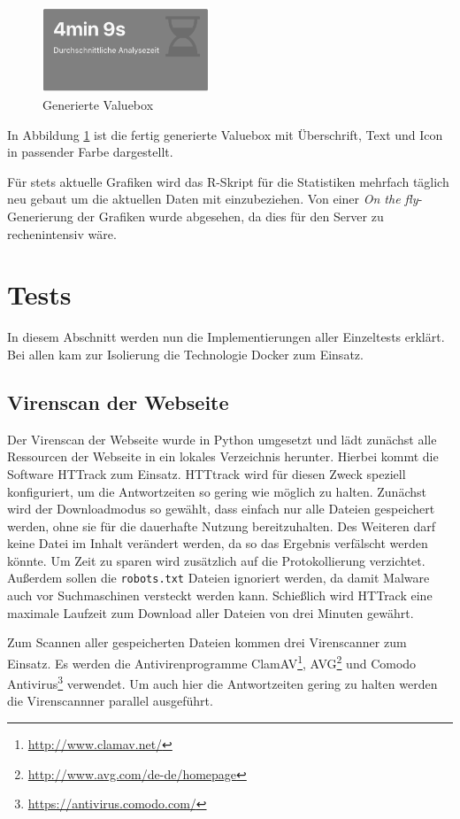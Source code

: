 \begin{figure}[H]
  \centering
  \includegraphics[width=5cm]{images/stats/valuebox}
  \caption{Generierte Valuebox}
  \label{fig:valuebox}
\end{figure}

In Abbildung \ref{fig:valuebox} ist die fertig generierte Valuebox mit Überschrift, Text und Icon in passender Farbe dargestellt.

Für stets aktuelle Grafiken wird das R-Skript für die Statistiken mehrfach täglich neu gebaut um die aktuellen Daten mit einzubeziehen. Von einer \textit{On the fly}-Generierung der Grafiken wurde abgesehen, da dies für den Server zu rechenintensiv wäre.

\section{Tests}

In diesem Abschnitt werden nun die Implementierungen aller Einzeltests erklärt. Bei allen kam zur
Isolierung die Technologie Docker zum Einsatz.

\subsection{Virenscan der Webseite}

Der Virenscan der Webseite wurde in Python umgesetzt und lädt zunächst alle Ressourcen der Webseite
in ein lokales Verzeichnis herunter. Hierbei kommt die Software HTTrack zum Einsatz. HTTtrack wird
für diesen Zweck speziell konfiguriert, um die Antwortzeiten so gering wie möglich zu halten.
Zunächst wird der Downloadmodus so gewählt, dass einfach nur alle Dateien gespeichert werden, ohne
sie für die dauerhafte Nutzung bereitzuhalten. Des Weiteren darf keine Datei im Inhalt verändert
werden, da so das Ergebnis verfälscht werden könnte. Um Zeit zu sparen wird zusätzlich auf die
Protokollierung verzichtet. Außerdem sollen die \lstinline[style=eclipse]{robots.txt} Dateien
ignoriert werden, da damit Malware auch vor Suchmaschinen versteckt werden kann. Schießlich wird
HTTrack eine maximale Laufzeit zum Download aller Dateien von drei Minuten gewährt.

Zum Scannen aller gespeicherten Dateien kommen drei Virenscanner zum Einsatz. Es werden die Antivirenprogramme ClamAV\footnote{\url{http://www.clamav.net/}}, AVG\footnote{\url{http://www.avg.com/de-de/homepage}} und Comodo Antivirus\footnote{\url{https://antivirus.comodo.com/}} verwendet. Um auch hier die Antwortzeiten gering zu halten werden die Virenscannner parallel ausgeführt.

